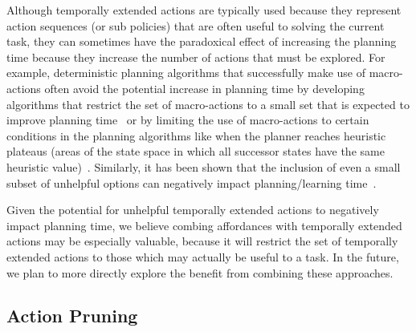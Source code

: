 \documentclass[]{article}
\newcommand{\jmnote}[1]{\textcolor{Green}{\textbf{JM: #1}}}
\begin{document}
Although temporally extended actions are typically used
because they represent action sequences (or sub policies) that are often useful to solving
the current task, they can sometimes have the paradoxical effect
of increasing the planning time because they increase the number of actions that must be explored.
For example, deterministic planning algorithms that successfully make use of macro-actions often avoid the potential increase
in planning time by developing algorithms that restrict the set of macro-actions to a small set that is expected to improve planning time~\cite{Botea:2005kx,Newton:2005vn} or by limiting the use of macro-actions to certain conditions
in the planning algorithms like when the planner reaches heuristic plateaus (areas of the state space in which all successor states have the same heuristic value)~\cite{Coles:2007ys}. Similarly, it has been shown that the inclusion
of even a small subset of unhelpful options can negatively impact planning/learning time~\cite{Jong:2008zr}.

Given the potential for unhelpful temporally extended actions to negatively impact planning time, we believe combing affordances with temporally extended actions
may be especially valuable, because it will restrict the set of temporally extended actions to those
which may actually be useful to a task. In the future, we plan to more directly explore the benefit from combining
these approaches.



\subsection{Action Pruning}
\end{document}
